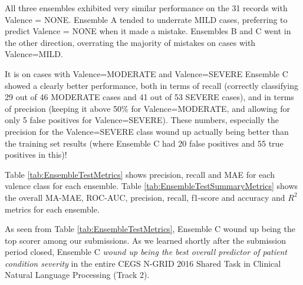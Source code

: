 All three ensembles exhibited very similar performance
on the 31 records with \textsf{Valence = NONE}.
\textsf{Ensemble A} tended to underrate \textsf{MILD}
cases, preferring to predict \textsf{Valence = NONE}
when it made a mistake.  \textsf{Ensembles B} and \textsf{C}
went in the other direction, overrating the majority
of mistakes on cases with \textsf{Valence=MILD}.

It is on cases with \textsf{Valence=MODERATE} and \textsf{Valence=SEVERE}
\textsf{Ensemble C} showed a clearly better performance, both
in terms of recall (correctly classifying 29 out of 46 \textsf{MODERATE}
cases and 41 out of 53 \textsf{SEVERE} cases), and in terms
of precision (keeping it above 50\% for \textsf{Valence=MODERATE},
and allowing for only 5 false positives for \textsf{Valence=SEVERE}).
These numbers, especially the precision for the
\textsf{Valence=SEVERE} class wound up actually
being better than the training set results (where
\textsf{Ensemble C} had 20 false positives and 55 true positives
in this)!

Table \ref{tab:EnsembleTestMetrics} shows precision, recall
and \textsf{MAE} for each valence class for each ensemble.
Table \ref{tab:EnsembleTestSummaryMetrics} shows the overall
\textsf{MA-MAE}, \textsf{ROC-AUC}, precision, recall, f1-score and accuracy and \textsf{$R^2$} metrics for each
ensemble.

As seen from Table \ref{tab:EnsembleTestMetrics}, \textsf{Ensemble C}
wound up being the top scorer among our submissions.  
As we learned shortly after the submission period closed, 
\textsf{Ensemble C} \textit{wound up being the best overall predictor of
patient condition severity} in the entire CEGS N-GRID 2016 Shared Task in Clinical Natural Language Processing (Track 2).
